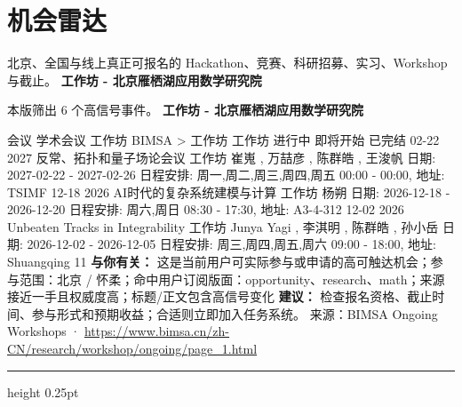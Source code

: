 \documentclass[10.5pt]{ctexart}
\begin{document}
\section*{机会雷达}
{\color{ormuted} 北京、全国与线上真正可报名的 Hackathon、竞赛、科研招募、实习、Workshop 与截止。}
\vspace{2mm}
{\LARGE\bfseries 工作坊 - 北京雁栖湖应用数学研究院}\par
\vspace{1mm}
{\color{ormuted} 本版筛出 6 个高信号事件。}
\vspace{3mm}
{\Large\bfseries 工作坊 - 北京雁栖湖应用数学研究院}\par
会议 学术会议 工作坊 BIMSA > 工作坊 工作坊 进行中 即将开始 已完结 02-22 2027 反常、拓扑和量子场论会议 工作坊 崔嵬 , 万喆彦 , 陈群皓 , 王浚帆 日期: 2027-02-22 - 2027-02-26 日程安排: 周一,周二,周三,周四,周五 00:00 - 00:00, 地址: TSIMF 12-18 2026 AI时代的复杂系统建模与计算 工作坊 杨朔 日期: 2026-12-18 - 2026-12-20 日程安排: 周六,周日 08:30 - 17:30, 地址: A3-4-312 12-02 2026 Unbeaten Tracks in Integrability 工作坊 Junya Yagi , 李淇明 , 陈群皓 , 孙小岳 日期: 2026-12-02 - 2026-12-05 日程安排: 周三,周四,周五,周六 09:00 - 18:00, 地址: Shuangqing 11
\textbf{与你有关：} 这是当前用户可实际参与或申请的高可触达机会；参与范围：北京 / 怀柔；命中用户订阅版面：opportunity、research、math；来源接近一手且权威度高；标题/正文包含高信号变化
\textbf{建议：} 检查报名资格、截止时间、参与形式和预期收益；合适则立即加入任务系统。
{\footnotesize\color{ormuted} 来源：BIMSA Ongoing Workshops · \url{https://www.bimsa.cn/zh-CN/research/workshop/ongoing/page_1.html}}
\vspace{4mm}
\hrule height 0.25pt
\vspace{3mm}
\end{document}
